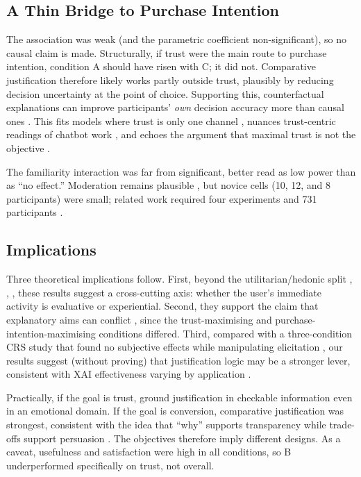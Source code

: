 \documentclass[conference]{IEEEtran}
\begin{document}
\subsection{A Thin Bridge to Purchase Intention}

The association was weak (and the parametric coefficient non-significant), so no causal
claim is made. Structurally, if trust were the main route to purchase intention, condition A
should have risen with C; it did not. Comparative justification therefore likely works partly
outside trust, plausibly by reducing decision uncertainty at the point of choice. Supporting
this, counterfactual explanations can improve participants' \textit{own} decision accuracy
more than causal ones \cite{celar2023}. This fits models where trust is only one channel
\cite{liyang2025}, nuances trust-centric readings of chatbot work \cite{yen2021}, and echoes
the argument that maximal trust is not the objective \cite{naiseh2021}.

The familiarity interaction was far from significant, better read as low power than as
``no effect.'' Moderation remains plausible \cite{bayer2023}, but novice cells (10, 12, and 8
participants) were small; related work required four experiments and 731 participants
\cite{celar2023}.

\subsection{Implications}

Three theoretical implications follow. First, beyond the utilitarian/hedonic split
\cite{chen2024}, \cite{wangx2022}, \cite{varga2024}, these results suggest a cross-cutting
axis: whether the user's immediate activity is evaluative or experiential. Second, they
support the claim that explanatory aims can conflict \cite{tintarev2012}, since the
trust-maximising and purchase-intention-maximising conditions differed. Third, compared with
a three-condition CRS study that found no subjective effects while manipulating elicitation
\cite{ziegfeld2025}, our results suggest (without proving) that justification logic may be a
stronger lever, consistent with XAI effectiveness varying by application \cite{rong2024}.

Practically, if the goal is trust, ground justification in checkable information even in an
emotional domain. If the goal is conversion, comparative justification was strongest,
consistent with the idea that ``why'' supports transparency while trade-offs support
persuasion \cite{pu2012}. The objectives therefore imply different designs. As a caveat,
usefulness and satisfaction were high in all conditions, so B underperformed specifically on
trust, not overall.
\end{document}
